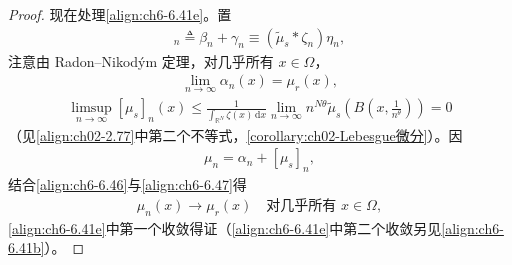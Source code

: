 \documentclass[../../main.tex]{subfiles}%
\begin{document}
\begin{proof}
现在处理\eqref{align:ch6-6.41e}。置
\begin{align}
[\mu_s]_n\triangleq \beta_n+\gamma_n\equiv(\widetilde\mu_s*\zeta_n)\eta_n, \label{align:ch6-6.45}
\end{align}
注意由 Radon--Nikodým 定理，对几乎所有 $x\in\Omega$，
\begin{align}
\lim_{n\to\infty}\alpha_n(x)=\mu_r(x), \label{align:ch6-6.46}
\end{align}
\begin{align}
\limsup_{n\to\infty}[\mu_s]_n(x)
\leqslant\frac{1}{\int_{\mathbb{R}^N}\zeta(x)\,\mathrm{d}x}
\lim_{n\to\infty}n^{N\theta}\widetilde\mu_s\left(B\left(x,\frac{1}{n^\theta}\right)\right)=0 \label{align:ch6-6.47}
\end{align}
（见\eqref{align:ch02-2.77}中第二个不等式，\cref{corollary:ch02-Lebesgue微分}）。因
\begin{align*}
\mu_n=\alpha_n+[\mu_s]_n,
\end{align*}
结合\eqref{align:ch6-6.46}与\eqref{align:ch6-6.47}得
\begin{align*}
\mu_n(x)\to\mu_r(x) \quad\text{对几乎所有 }x\in\Omega,
\end{align*}
\eqref{align:ch6-6.41e}中第一个收敛得证（\eqref{align:ch6-6.41e}中第二个收敛另见\eqref{align:ch6-6.41b}）。


\end{proof}
\end{document}
